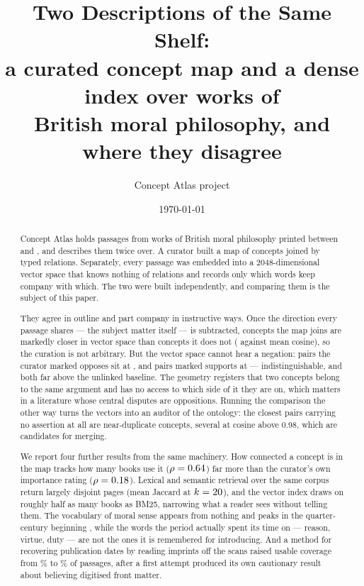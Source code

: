 \documentclass[11pt,a4paper]{article}
\title{Two Descriptions of the Same Shelf:\\
       a curated concept map and a dense index over \NBooks{} works of\\
       British moral philosophy, and where they disagree}
\author{Concept Atlas project}
\date{\today}
\newcommand{\rel}[1]{\textsf{#1}}
\begin{document}
\maketitle

\begin{abstract}
Concept Atlas holds \NPassages{} passages from \NBooks{} works of British moral
philosophy printed between \YearMin{} and \YearMax{}, and describes them twice
over. A curator built a map of \NConcepts{} concepts joined by \NAssertions{}
typed relations. Separately, every passage was embedded into a
2048-dimensional vector space that knows nothing of relations and records only
which words keep company with which. The two were built independently, and
comparing them is the subject of this paper.

They agree in outline and part company in instructive ways. Once the
direction every passage shares --- the subject matter itself --- is subtracted,
concepts the map joins are markedly closer in vector space than concepts it
does not (\CosLinked{} against \CosUnlinked{} mean cosine), so the curation is
not arbitrary. But the vector space cannot hear a negation: pairs the curator
marked \rel{opposes} sit at \CosOpposes{}, and pairs marked \rel{supports} at
\CosSupports{} --- indistinguishable, and both far above the unlinked
baseline. The geometry registers that two concepts belong to the same
argument and has no access to which side of it they are on, which matters in a
literature whose central disputes are oppositions. Running the comparison the
other way turns the vectors into an auditor of the ontology: the closest pairs
carrying no assertion at all are near-duplicate concepts, several at cosine
above 0.98, which are candidates for merging.

We report four further results from the same machinery. How connected a
concept is in the map tracks how many books use it ($\rho=0.64{}$)
far more than the curator's own importance rating ($\rho=0.18{}$).
Lexical and semantic retrieval over the same corpus return largely disjoint
pages (mean Jaccard \MeanJaccard{} at $k=20{}$), and the vector index
draws on roughly half as many books as BM25, narrowing what a reader sees
without telling them. The vocabulary of moral sense appears from nothing and
peaks in the quarter-century beginning \PeakMoralSense{}, while the words the
period actually spent its time on --- reason, virtue, duty --- are not the ones
it is remembered for introducing. And a method for recovering publication dates
by reading imprints off the scans raised usable coverage from
\CoverageBefore\% to \CoverageAfter\% of passages, after a first attempt
produced its own cautionary result about believing digitised front matter.
\end{abstract}
\end{document}
